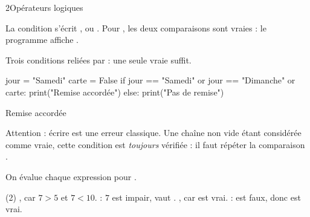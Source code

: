 \begin{corrige}{2}{Opérateurs logiques}
\begin{questions}
  \item La condition s'écrit , ou . Pour , les deux comparaisons
    sont vraies : le programme affiche .
  \item Trois conditions reliées par  : une seule vraie suffit.
\begin{python}
jour = "Samedi"
carte = False
if jour == "Samedi" or jour == "Dimanche" or carte:
    print("Remise accordée")
else:
    print("Pas de remise")
\end{python}
\begin{console}
Remise accordée
\end{console}
    Attention : écrire  est une erreur classique. Une chaîne non vide étant considérée comme vraie,
    cette condition est \emph{toujours} vérifiée : il faut répéter la comparaison .
  \item On évalue chaque expression pour .\par\nopagebreak
\begin{tasks}[label=\alph*)](2)
  \task {}, car $7>5$ et $7<10$.
  \task {} : $7$ est impair,  vaut .
  \task {}, car  est vrai.
  \task {} :  est faux, donc  est vrai.
\end{tasks}
\end{questions}
\end{corrige}

